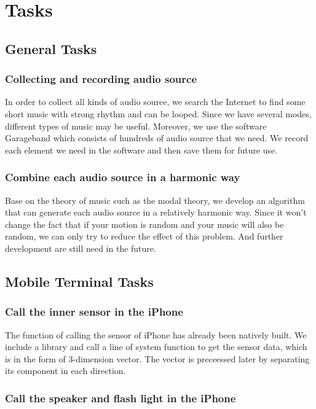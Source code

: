 \section{Tasks}

\subsection{General Tasks}

\subsubsection{Collecting and recording audio source}

In order to collect all kinds of audio source, we search the Internet to find
some short music with strong rhythm and can be looped. Since we have several
modes, different types of music may be useful. Moreover, we use the software
Garageband which consists of hundreds of audio source that we need. We record
each element we need in the software and then save them for future use. 

\subsubsection{Combine each audio source in a harmonic way}

Base on the theory of music such as the modal theory, we develop an algorithm
that can generate each audio source in a relatively harmonic way. Since it won’t
change the fact that if your motion is random and your music will also be
random, we can only try to reduce the effect of this problem. And further
development are still need in the future.  

\subsection{Mobile Terminal Tasks}

\subsubsection{Call the inner sensor in the iPhone}

The function of calling the sensor of iPhone has already been natively built.
We include a library and call a line of system function to get the sensor data,
which is in the form of 3-dimension vector.
The vector is preceessed later by separating its component in each direction.


\subsubsection{Call the speaker and flash light in the iPhone}

